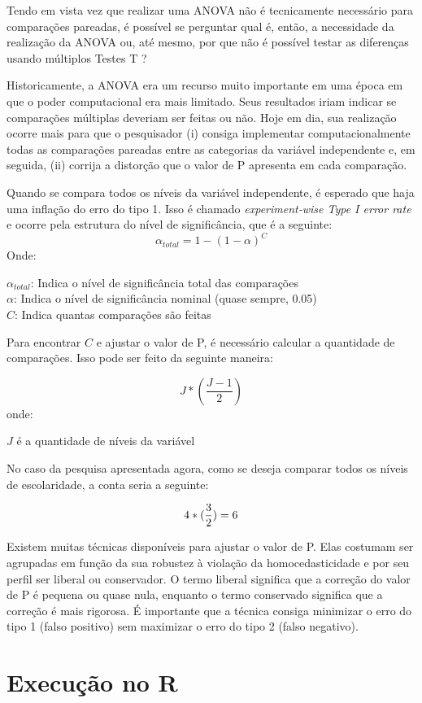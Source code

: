 \documentclass[
]{book}
\begin{document}
Tendo em vista vez que realizar uma ANOVA não é tecnicamente necessário para comparações pareadas, é possível se perguntar qual é, então, a necessidade da realização da ANOVA ou, até mesmo, por que não é possível testar as diferenças usando múltiplos Testes T ?

Historicamente, a ANOVA era um recurso muito importante em uma época em que o poder computacional era mais limitado. Seus resultados iriam indicar se comparações múltiplas deveriam ser feitas ou não. Hoje em dia, sua realização ocorre mais para que o pesquisador (i) consiga implementar computacionalmente todas as comparações pareadas entre as categorias da variável independente e, em seguida, (ii) corrija a distorção que o valor de P apresenta em cada comparação.

Quando se compara todos os níveis da variável independente, é esperado que haja uma inflação do erro do tipo 1. Isso é chamado \emph{experiment‑wise Type I error rate} e ocorre pela estrutura do nível de significância, que é a seguinte:
\[\alpha_{total}=1-(1-\alpha)^C\]
Onde:

\(\alpha_{total}\): Indica o nível de significância total das comparações\\
\(\alpha\): Indica o nível de significância nominal (quase sempre, 0.05)\\
\(C\): Indica quantas comparações são feitas

Para encontrar \(C\) e ajustar o valor de P, é necessário calcular a quantidade de comparações. Isso pode ser feito da seguinte maneira:

\[J*(\frac{J-1}2)\]
onde:

\(J\) é a quantidade de níveis da variável

No caso da pesquisa apresentada agora, como se deseja comparar todos os níveis de escolaridade, a conta seria a seguinte:

\[4*(\frac{3}{2})\\=6\]

Existem muitas técnicas disponíveis para ajustar o valor de P. Elas costumam ser agrupadas em função da sua robustez à violação da homocedasticidade e por seu perfil ser liberal ou conservador. O termo liberal significa que a correção do valor de P é pequena ou quase nula, enquanto o termo conservado significa que a correção é mais rigorosa. É importante que a técnica consiga minimizar o erro do tipo 1 (falso positivo) sem maximizar o erro do tipo 2 (falso negativo).

\hypertarget{execuuxe7uxe3o-no-r-7}{%
\section{Execução no R}\label{execuuxe7uxe3o-no-r-7}}
\end{document}
